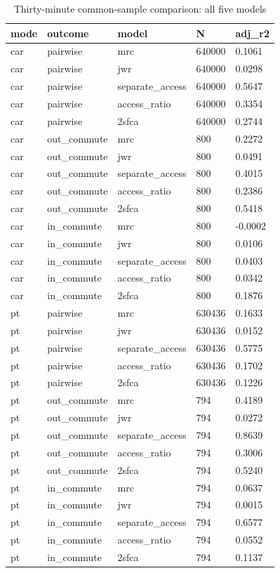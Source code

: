\begin{table}[htbp]
\centering
\scriptsize
\caption{Thirty-minute common-sample comparison: all five models}
\label{tab:total-main}
\begin{tabular}{lllll}
\toprule
mode & outcome & model & N & adj\_r2 \\
\midrule
car & pairwise & mrc & 640000 & 0.1061 \\
car & pairwise & jwr & 640000 & 0.0298 \\
car & pairwise & separate\_access & 640000 & 0.5647 \\
car & pairwise & access\_ratio & 640000 & 0.3354 \\
car & pairwise & 2sfca & 640000 & 0.2744 \\
car & out\_commute & mrc & 800 & 0.2272 \\
car & out\_commute & jwr & 800 & 0.0491 \\
car & out\_commute & separate\_access & 800 & 0.4015 \\
car & out\_commute & access\_ratio & 800 & 0.2386 \\
car & out\_commute & 2sfca & 800 & 0.5418 \\
car & in\_commute & mrc & 800 & -0.0002 \\
car & in\_commute & jwr & 800 & 0.0106 \\
car & in\_commute & separate\_access & 800 & 0.0403 \\
car & in\_commute & access\_ratio & 800 & 0.0342 \\
car & in\_commute & 2sfca & 800 & 0.1876 \\
pt & pairwise & mrc & 630436 & 0.1633 \\
pt & pairwise & jwr & 630436 & 0.0152 \\
pt & pairwise & separate\_access & 630436 & 0.5775 \\
pt & pairwise & access\_ratio & 630436 & 0.1702 \\
pt & pairwise & 2sfca & 630436 & 0.1226 \\
pt & out\_commute & mrc & 794 & 0.4189 \\
pt & out\_commute & jwr & 794 & 0.0272 \\
pt & out\_commute & separate\_access & 794 & 0.8639 \\
pt & out\_commute & access\_ratio & 794 & 0.3006 \\
pt & out\_commute & 2sfca & 794 & 0.5240 \\
pt & in\_commute & mrc & 794 & 0.0637 \\
pt & in\_commute & jwr & 794 & 0.0015 \\
pt & in\_commute & separate\_access & 794 & 0.6577 \\
pt & in\_commute & access\_ratio & 794 & 0.0552 \\
pt & in\_commute & 2sfca & 794 & 0.1137 \\
\bottomrule
\end{tabular}
\end{table}
